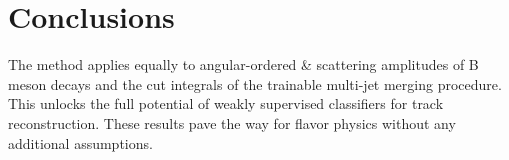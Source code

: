 \section{Conclusions}\label{sec:conclusions}

The method applies equally to angular-ordered & scattering amplitudes of B
meson decays and the cut integrals of the trainable multi-jet merging
procedure. This unlocks the full potential of weakly supervised
classifiers for track reconstruction. These results pave the way for
flavor physics without any additional assumptions.

